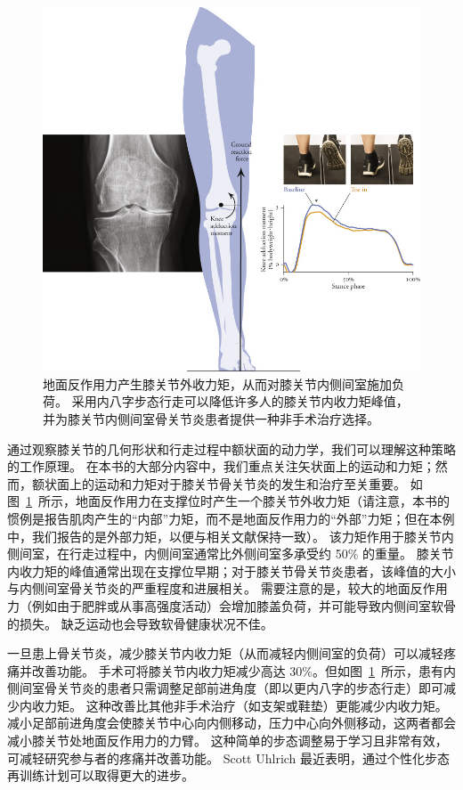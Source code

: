 \begin{figure}[!htb]
	\centering
	\includegraphics[width=1.0\linewidth]{chap8/8_11}
	\caption{地面反作用力产生膝关节外收力矩，从而对膝关节内侧间室施加负荷。
		采用内八字步态行走可以降低许多人的膝关节内收力矩峰值，并为膝关节内侧间室骨关节炎患者提供一种非手术治疗选择\cite{shull2013six}。 \label{fig:8_11}}
\end{figure}


通过观察膝关节的几何形状和行走过程中额状面的动力学，我们可以理解这种策略的工作原理。
在本书的大部分内容中，我们重点关注矢状面上的运动和力矩；然而，额状面上的运动和力矩对于膝关节骨关节炎的发生和治疗至关重要。
如图~\ref{fig:8_11}~所示，地面反作用力在支撑位时产生一个膝关节外收力矩（请注意，本书的惯例是报告肌肉产生的“内部”力矩，而不是地面反作用力的“外部”力矩；但在本例中，我们报告的是外部力矩，以便与相关文献保持一致）。
该力矩作用于膝关节内侧间室，在行走过程中，内侧间室通常比外侧间室多承受约 50\% 的重量。
膝关节内收力矩的峰值通常出现在支撑位早期；对于膝关节骨关节炎患者，该峰值的大小与内侧间室骨关节炎的严重程度和进展相关。
需要注意的是，较大的地面反作用力（例如由于肥胖或从事高强度活动）会增加膝盖负荷，并可能导致内侧间室软骨的损失。
缺乏运动也会导致软骨健康状况不佳。


一旦患上骨关节炎，减少膝关节内收力矩（从而减轻内侧间室的负荷）可以减轻疼痛并改善功能。
手术可将膝关节内收力矩减少高达 30\%。但如图~\ref{fig:8_11}~所示，患有内侧间室骨关节炎的患者只需调整足部前进角度（即以更内八字的步态行走）即可减少内收力矩。
这种改善比其他非手术治疗（如支架或鞋垫）更能减少内收力矩。
减小足部前进角度会使膝关节中心向内侧移动，压力中心向外侧移动，这两者都会减小膝关节处地面反作用力的力臂。
这种简单的步态调整易于学习且非常有效，可减轻研究参与者的疼痛并改善功能\cite{shull2013six}。 
Scott Uhlrich 最近表明，通过个性化步态再训练计划可以取得更大的进步\cite{simpson2019connecting}。


